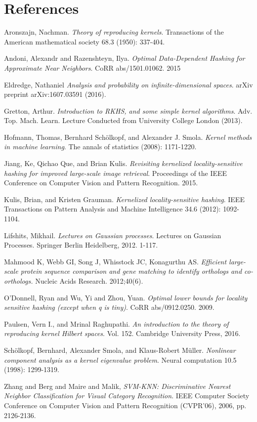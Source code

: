 \documentclass[twoside,11pt]{homework}
\begin{document}
\section*{References}
\beginrefs

 Aronszajn, Nachman. \emph{Theory of reproducing kernels}. Transactions of the American mathematical society 68.3 (1950): 337-404.

 Andoni, Alexandr and Razenshteyn, Ilya. \emph{Optimal Data-Dependent Hashing for Approximate Near Neighbors}. CoRR abs/1501.01062. 2015

 Eldredge, Nathaniel \emph{Analysis and probability on infinite-dimensional spaces}. arXiv preprint arXiv:1607.03591 (2016).

 Gretton, Arthur. \emph{Introduction to RKHS, and some simple kernel algorithms}. Adv. Top. Mach. Learn. Lecture Conducted from University College London (2013).

 Hofmann, Thomas, Bernhard Schölkopf, and Alexander J. Smola. \emph{Kernel methods in machine learning}. The annals of statistics (2008): 1171-1220.

 Jiang, Ke, Qichao Que, and Brian Kulis. \emph{Revisiting kernelized locality-sensitive hashing for improved large-scale image retrieval}. Proceedings of the IEEE Conference on Computer Vision and Pattern Recognition. 2015.
  
 Kulis, Brian, and Kristen Grauman. \emph{Kernelized locality-sensitive hashing}. IEEE Transactions on Pattern Analysis and Machine Intelligence 34.6 (2012): 1092-1104.

 Lifshits, Mikhail. \emph{Lectures on Gaussian processes}. Lectures on Gaussian Processes. Springer Berlin Heidelberg, 2012. 1-117.

 Mahmood K, Webb GI, Song J, Whisstock JC, Konagurthu AS. \emph{Efficient large-scale protein sequence comparison and gene matching to identify orthologs and co-orthologs.} Nucleic Acids Research. 2012;40(6).

 O'Donnell, Ryan and Wu, Yi and Zhou, Yuan. \emph{Optimal lower bounds for locality sensitive hashing (except when q is tiny)}. CoRR abs/0912.0250.  2009. 

 Paulsen, Vern I., and Mrinal Raghupathi. \emph{An introduction to the theory of reproducing kernel Hilbert spaces}. Vol. 152. Cambridge University Press, 2016. 

 Sch\"olkopf, Bernhard, Alexander Smola, and Klaus-Robert Müller. \emph{Nonlinear component analysis as a kernel eigenvalue problem}. Neural computation 10.5 (1998): 1299-1319.

 Zhang and Berg and Maire and Malik, \emph{SVM-KNN: Discriminative Nearest Neighbor Classification for Visual Category Recognition}. IEEE Computer Society Conference on Computer Vision and Pattern Recognition (CVPR'06), 2006, pp. 2126-2136.


\endrefs
\end{document}
